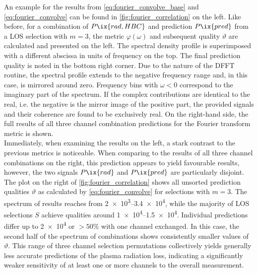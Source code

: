         An example for the results from \cref{eq:fourier_convolve_base} and \cref{eq:fourier_convolve} can be found in \cref{fig:fourier_correlation} on the left. Like before, for a combination of $P\ix{rad,HBC}$ and prediction $P\ix{pred}$ from a LOS  selection with $m=3$, the metric $\varphi\left(\omega\right)$ and subsequent quality $\vartheta$ are calculated and presented on the left. The spectral density profile is superimposed with a different abscissa in units of frequency on the top. The final prediction quality is noted in the bottom right corner. Due to the nature of the DFFT routine, the spectral profile extends to the negative frequency range and, in this case, is mirrored around zero. Frequency bins with $\omega<0$ correspond to the imaginary part of the spectrum. If the complex contributions are identical to the real, i.e. the negative is the mirror image of the positive part, the provided signals and their coherence are found to be exclusively real\cite{Cooley1965}. On the right-hand side, the full results of all three channel combination predictions for the Fourier transform metric is shown.\\%
        Immediately, when examining the results on the left, a stark contrast to the previous metrics is noticeable. When comparing to the results of all three channel combinations on the right, this prediction appears to yield favourable results, however, the two signals $P\ix{rad}$ and $P\ix{pred}$ are particularly disjoint. The plot on the right of \cref{fig:fourier_correlation} shows all unsorted prediction qualities $\vartheta$ as calculated by \cref{eq:fourier_convolve} for selections with $m=3$. The spectrum of results reaches from \SIrange{2e3}{3.4e4}{\arbitraryunit}, while the majority of LOS selections $S$ achieve qualities around \SIrange{1e4}{1.5e4}{\arbitraryunit}. Individual predictions differ up to \SI{2e4}{\arbitraryunit} or $>50\%$ with one channel exchanged. In this case, the second half of the spectrum of combinations shows consistently smaller values of $\vartheta$. This range of three channel selection permutations collectively yields generally less accurate predictions of the plasma radiation loss, indicating a significantly weaker sensitivity of at least one or more channels to the overall measurement.\\%
%
